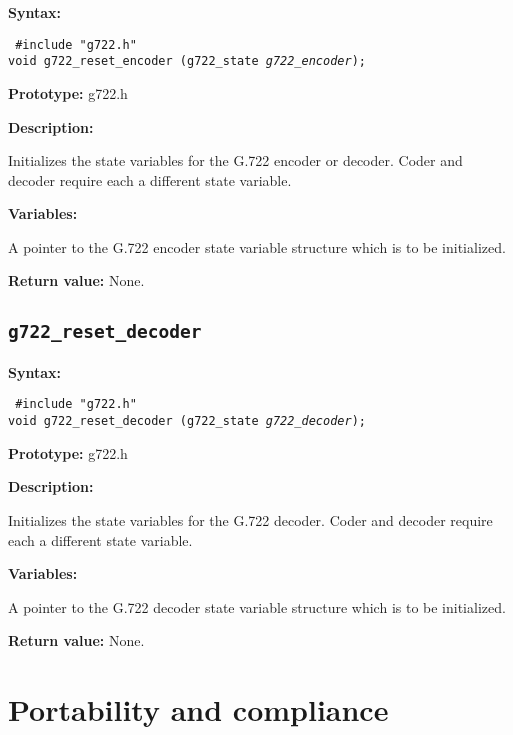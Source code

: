 {\bf Syntax: }

{\tt
\#include "g722.h"\\
     void g722\_reset\_encoder (g722\_state {\em *g722\_encoder});
}

{\bf Prototype: }    g722.h

{\bf Description: }

        Initializes the state variables for the G.722 encoder or decoder.
        Coder and decoder require each a different state variable.

{\bf Variables: }
\begin{Descr}{\DescrLen}
\item[\pbox{20mm}{\em g722\_encoder}] %
        A pointer to the G.722 encoder state variable structure which
        is to be initialized.
\end{Descr}

{\bf Return value: }    None.


\subsection{{\tt g722\_reset\_decoder}}

{\bf Syntax: }

{\tt
\#include "g722.h"\\
  void g722\_reset\_decoder (g722\_state {\em *g722\_decoder});
}

{\bf Prototype: }    g722.h

{\bf Description: }

        Initializes the state variables for the G.722 decoder.
        Coder and decoder require each a different state variable.

{\bf Variables: }
\begin{Descr}{\DescrLen}
\item[\pbox{20mm}{\em g722\_decoder}] %
        A pointer to the G.722 decoder state variable structure which
        is to be initialized.
\end{Descr}


{\bf Return value: }       None.

\newpage

\section{Portability and compliance}

